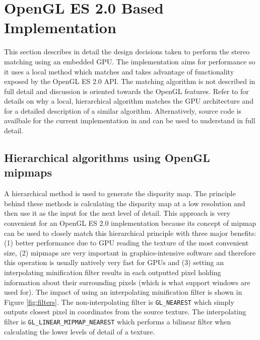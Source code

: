 \documentclass[conference]{IEEEtran}
\begin{document}

\section{OpenGL ES 2.0 Based Implementation}
This section describes in detail the design decisions taken to perform the stereo matching using an embedded GPU. The implementation aims for performance so it uses a local method which matches and takes advantage of functionality exposed by the OpenGL ES 2.0 API. The matching algorithm is not described in full detail and discussion is oriented towards the OpenGL features. Refer to \cite{jonsson03} for details on why a local, hierarchical algorithm matches the GPU architecture and for a detailed description of a similar algorithm. Alternatively, source code is availbale for the current implementation in \cite{aguiar14} and can be used to understand in full detail.

 \subsection{Hierarchical algorithms using OpenGL mipmaps}
A hierarchical method is used to generate the disparity map. The principle behind these methods is calculating the disparity map at a low resolution and then use it as the input for the next level of detail. This approach is very convenient for an OpenGL ES 2.0 implementation because its concept of mipmap can be used to closely match this hierarchical principle with three major benefits: (1) better performance due to GPU reading the texture of the most convenient size, (2) mipmaps are very important in graphics-intensive software and therefore this operation is usually natively very fast for GPUs and (3) setting an interpolating minification filter results in each outputted pixel holding information about their surrounding pixels (which is what support windows are used for). The impact of using an interpolating minification filter is shown in Figure \ref{fig:filters}. The non-interpolating filter is \texttt{GL\_NEAREST} which simply outputs closest pixel in coordinates from the source texture. The interpolating filter is \texttt{GL\_LINEAR\_MIPMAP\_NEAREST} which performs a bilinear filter when calculating the lower levels of detail of a texture.
\end{document}

